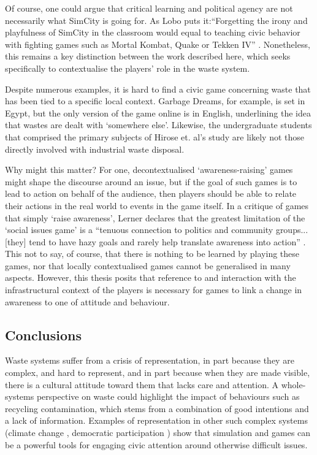\documentclass[nofonts,nols,justified,nobib]{tufte-book}
\begin{document}
Of course, one could argue that critical learning and political agency are not necessarily what SimCity is going for. As Lobo puts it:``Forgetting the irony and playfulness of SimCity in the classroom would equal to teaching civic behavior with fighting games such as Mortal Kombat, Quake or Tekken IV'' \cite{lobo_city_2004}. Nonetheless, this remains a key distinction between the work described here, which seeks specifically to contextualise the players' role in the waste system.

Despite numerous examples, it is hard to find a civic game concerning waste that has been tied to a specific local context. Garbage Dreams, for example, is set in Egypt, but the only version of the game online is in English, underlining the idea that wastes are dealt with `somewhere else'. Likewise, the undergraduate students that comprised the primary subjects of Hirose et. al's study are likely not those directly involved with industrial waste disposal. 

Why might this matter? For one, decontextualised `awareness-raising' games might shape the discourse around an issue, but if the goal of such games is to lead to action on behalf of the audience, then players should be able to relate their actions in the real world to events in the game itself. In a critique of games that simply `raise awareness', Lerner declares that the greatest limitation of the `social issues game' is a ``tenuous connection to politics and community groups... [they] tend to have hazy goals and rarely help translate awareness into action'' \cite{lerner_making_2014}. This not to say, of course, that there is nothing to be learned by playing these games, nor that locally contextualised games cannot be generalised in many aspects. However, this thesis posits that reference to and interaction with the infrastructural context of the players is necessary for games to link a change in awareness to one of attitude and behaviour.

\subsection*{Conclusions}
Waste systems suffer from a crisis of representation, in part because they are complex, and hard to represent, and in part because when they are made visible, there is a cultural attitude toward them that lacks care and attention. A whole-systems perspective on waste could highlight the impact of behaviours such as recycling contamination, which stems from a combination of good intentions and a lack of information. Examples of representation in other such complex systems (climate change \cite{sterman_world_2015, macklin_games_2013}, democratic participation \cite{lerner_making_2014, case_build_2016}) show that simulation and games can be a powerful tools for engaging civic attention around otherwise difficult issues.
\end{document}
